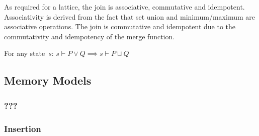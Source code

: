 As required for a lattice, the join is associative, commutative and idempotent.
Associativity is derived from the fact that set union and minimum/maximum are associative operations.
The join is commutative and idempotent due to the commutativity and idempotency of the merge function.
\begin{lemma}\label{lem:pred_soundness}
  For any state~$s$: $s\vdash  P\vee Q\implies s\vdash P\sqcup Q$
\end{lemma}

\subsection{Memory Models}

\subsubsection{???}

\subsubsection{Insertion}
